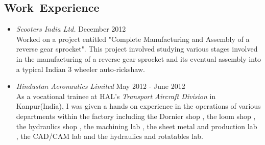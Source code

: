 \documentclass[11pt, line, margin]{res}
\begin{document}
\begin{resume}
\section{\Large Work\ Experience}
\begin{itemize}
\item \textit{Scooters India Ltd.} \hfill December 2012 \\ Worked on a project entitled "Complete Manufacturing and Assembly of a reverse gear sprocket". This project involved studying various stages involved in the manufacturing of a reverse gear sprocket and its eventual assembly into a typical Indian 3 wheeler auto-rickshaw.
\item \textit{Hindustan Aeronautics Limited} \hfill May 2012 - June 2012 \\ As a vocational trainee at HAL's \textit{Transport Aircraft Division} in Kanpur(India), I was given a hands on experience in the operations of various departments within the factory including the Dornier shop , the loom shop , the hydraulics shop , the machining lab , the sheet metal and production lab , the CAD/CAM lab and the hydraulics and rotatables lab.
\end{itemize}

\end{resume}
\end{document}
